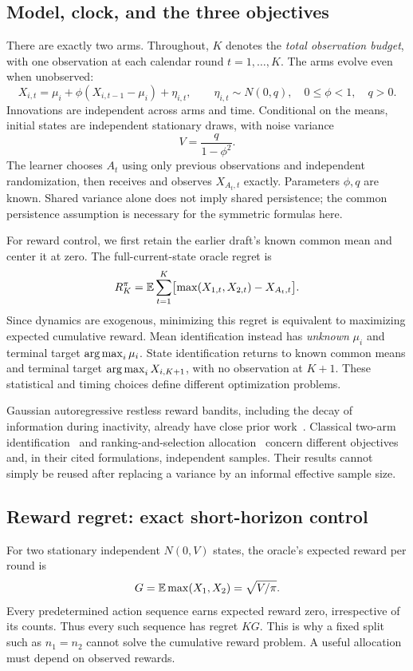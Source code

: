\subsection{Model, clock, and the three objectives}
There are exactly two arms. Throughout, $K$ denotes the \emph{total observation budget}, with one observation at each calendar round $t=1,\ldots,K$. The arms evolve even when unobserved:
\begin{equation}
X_{i,t}=\mu_i+\phi(X_{i,t-1}-\mu_i)+\eta_{i,t},\qquad
\eta_{i,t}\sim N(0,q),\quad 0\leq\phi<1,\quad q>0.
\label{two_arm_ar1:eq:model}
\end{equation}
Innovations are independent across arms and time. Conditional on the means, initial states are independent stationary draws, with noise variance
\begin{equation}
V=\frac{q}{1-\phi^2}.
\end{equation}
The learner chooses $A_t$ using only previous observations and independent randomization, then receives and observes $X_{A_t,t}$ exactly. Parameters $\phi,q$ are known. Shared variance alone does not imply shared persistence; the common persistence assumption is necessary for the symmetric formulas here.

For reward control, we first retain the earlier draft's known common mean and center it at zero. The full-current-state oracle regret is
\begin{equation}
R_K^\pi=\mathbb E\sum_{t=1}^K\bigl[\max(X_{1,t},X_{2,t})-X_{A_t,t}\bigr].
\label{two_arm_ar1:eq:regret}
\end{equation}
Since dynamics are exogenous, minimizing this regret is equivalent to maximizing expected cumulative reward. Mean identification instead has \emph{unknown} $\mu_i$ and terminal target $\operatorname*{arg\,max}_i\mu_i$. State identification returns to known common means and terminal target $\operatorname*{arg\,max}_iX_{i,K+1}$, with no observation at $K+1$. These statistical and timing choices define different optimization problems.

Gaussian autoregressive restless reward bandits, including the decay of information during inactivity, already have close prior work~\cite{collected28}. Classical two-arm identification~\cite{collected31} and ranking-and-selection allocation~\cite{collected32} concern different objectives and, in their cited formulations, independent samples. Their results cannot simply be reused after replacing a variance by an informal effective sample size.

\subsection{Reward regret: exact short-horizon control}
For two stationary independent $N(0,V)$ states, the oracle's expected reward per round is
\begin{equation}
G=\mathbb E\max(X_1,X_2)=\sqrt{V/\pi}.
\label{two_arm_ar1:eq:G}
\end{equation}
Every predetermined action sequence earns expected reward zero, irrespective of its counts. Thus every such sequence has regret $KG$. This is why a fixed split such as $n_1=n_2$ cannot solve the cumulative reward problem. A useful allocation must depend on observed rewards.

